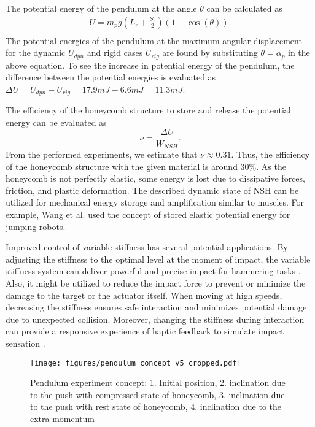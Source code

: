 \documentclass[lettersize,journal]{IEEEtran}
\begin{document}
The potential energy of the pendulum at the angle $\theta$ can be calculated as
\begin{equation}\label{eq:eq4}
\begin{aligned}
U = m_pg(L_r+\frac{S_c}{2})(1-\cos{(\theta)}).\\
\end{aligned}
\end{equation}
The potential energies of the pendulum at the maximum angular displacement for the dynamic $U_{dyn}$ and rigid cases $U_{rig}$ are found by substituting $\theta=\alpha_p$ in the above equation. To see the increase in potential energy of the pendulum, the difference between the potential energies is evaluated as $\Delta U=U_{dyn}-U_{rig}= 17.9mJ-6.6mJ = 11.3mJ$. 

The efficiency of the honeycomb structure to store and release the potential energy can be evaluated as 
\begin{equation}\label{eq:eq5}
    \nu = \frac{\Delta U}{W_{NSH}}.
\end{equation}
From the performed experiments, we estimate that $\nu\approx 0.31$. Thus, the efficiency of the honeycomb structure with the given material is around 30\%. As the honeycomb is not perfectly elastic, some energy is lost due to dissipative forces, friction, and plastic deformation. The described dynamic state of NSH can be utilized for mechanical energy storage and amplification similar to muscles. For example, Wang et al. \cite{wang2023insect} used the concept of stored elastic potential energy for jumping robots.

Improved control of variable stiffness has several potential applications. By adjusting the stiffness to the optimal level at the moment of impact, the variable stiffness system can deliver powerful and precise impact for hammering tasks \cite{garabini2011optimality}. Also, it might be utilized to reduce the impact force to prevent or minimize the damage to the target or the actuator itself. When moving at high speeds, decreasing the stiffness ensures safe interaction and minimizes potential damage \cite{bicchi2004fast, gasparri2015variable} due to unexpected collision. Moreover, changing the stiffness during interaction can provide a responsive experience of haptic feedback to simulate impact sensation \cite{mac2018variable, zuliani2021variable}.


\begin{figure}[thpb]
\centering
    \texttt{[image: figures/pendulum\_concept\_v5\_cropped.pdf]}
\caption {Pendulum experiment concept: 1. Initial position, 2. inclination due to the push with compressed state of honeycomb, 3. inclination due to the push with rest state of honeycomb, 4. inclination due to the extra momentum}
\label{pendulum_concept}
\vspace{-3mm}
\end{figure}
\end{document}
